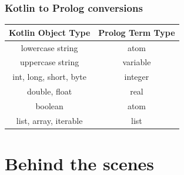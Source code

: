 \documentclass[presentation]{beamer}
\begin{document}
\begin{frame}%
    \frametitle{Kotlin to Prolog conversions}

    \begin{table}[]
        \centering
        \begin{tabular}{c|c}
            \textbf{Kotlin Object Type}        & \textbf{Prolog Term Type} \\
            \hline\hline
            lowercase string       & atom            \\
            uppercase string       & variable        \\
            int, long, short, byte & integer         \\
            double, float          & real            \\
            boolean                & atom            \\
            list, array, iterable  & list
        \end{tabular}
    \end{table}

\end{frame}

\section{Behind the scenes}
\end{document}
